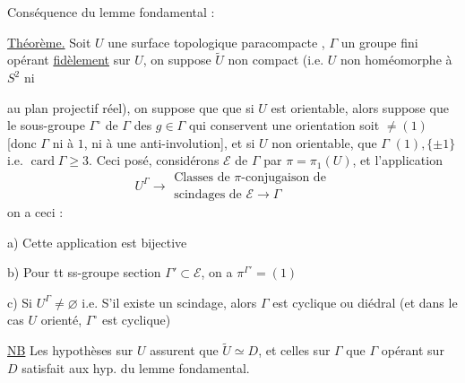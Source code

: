 
Conséquence du lemme fondamental :

\uline{Théorème.} Soit $U$ une surface topologique paracompacte , $\Gamma$ un groupe fini opérant \uline{fidèlement} sur $U$, on suppose $\widetilde U$  non compact (i.e. $U$ non homéomorphe à $S^2$ ni


au plan projectif réel), on suppose que  que  si $U$ est  orientable, alors   suppose que le sous-groupe $\Gamma^\circ$ de $\Gamma$ des $g\in\Gamma$ qui conservent une orientation soit $\ne(1)$ [donc $\Gamma$  ni à $1$, ni à  une anti-involution], et si $U$ non orientable, que  $\Gamma$ \unsure{$\not\simeq$|$\ne$} $(1),\{\pm1\}$ i.e. $\operatorname{card}\Gamma\ge3$. Ceci posé,  considérons   $\mathcal E$ de $\Gamma$ par $\pi=\pi_1(U)$, et l'application
\[
U^\Gamma\longrightarrow\begin{gathered}
\text{Classes de }\pi\text{-conjugaison de}\\
\text{scindages de }\mathcal E\longrightarrow\Gamma
\end{gathered}
\]
on a ceci :

 a) Cette application est bijective

 b) Pour tt ss-groupe section $\Gamma'\subset\mathcal E$, on a $\pi^{\Gamma'}=(1)$

 c) Si $U^\Gamma\ne\varnothing$ i.e. S'il existe un scindage, alors $\Gamma$ est cyclique ou diédral (et dans le cas $U$ orienté, $\Gamma^\circ$ est cyclique)

\uline{NB} Les hypothèses sur $U$ assurent que $\widetilde U\simeq D$, et celles sur $\Gamma$ que $\Gamma$ opérant sur $D$ satisfait aux hyp. du lemme fondamental.

